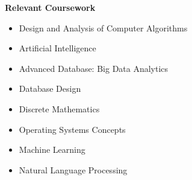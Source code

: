 \documentclass[letterpaper,11pt]{article}
\newcommand{\resheading}[1]{{\large \colorbox{mygrey}{\begin{minipage}{\textwidth}{\textbf{#1 \vphantom{p\^{E}}}}\end{minipage}}}}
\begin{document}
\resheading{Relevant Coursework}
	\begin{multicols}{2}
	\begin{itemize}
	\itemsep-0.1em
		\item{Design and Analysis of Computer Algorithms}
		\item{Artificial Intelligence} 
		\item{Advanced Database: Big Data Analytics}
		\item{Database Design}
		\item{Discrete Mathematics}
		\item{Operating Systems Concepts}
        \item{Machine Learning}
        \item{Natural Language Processing}
	\end{itemize}
	\end{multicols}
\end{document}
